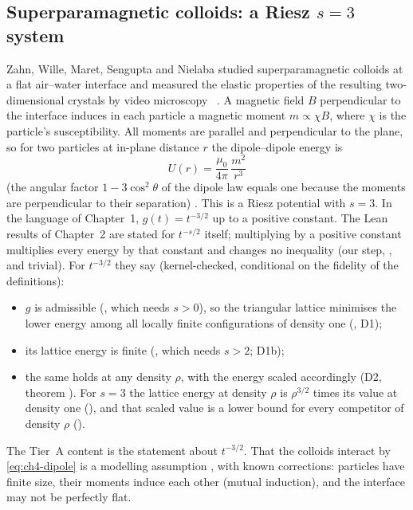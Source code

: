 \subsection{Superparamagnetic colloids: a Riesz \texorpdfstring{$s=3$}{s = 3} system}
Zahn, Wille, Maret, Sengupta and Nielaba studied superparamagnetic colloids at a flat air--water interface and
measured the elastic properties of the resulting two-dimensional crystals by video
microscopy~\cite{zahn} \tierL. A magnetic field $B$ perpendicular to the interface induces in each particle a
magnetic moment $m\propto\chi B$, where $\chi$ is the particle's susceptibility. All moments are parallel and
perpendicular to the plane, so for two particles at in-plane distance $r$ the dipole--dipole energy is
\begin{equation}\label{eq:ch4-dipole}
U(r) = \frac{\mu_0}{4\pi}\,\frac{m^2}{r^3}
\end{equation}
(the angular factor $1-3\cos^2\theta$ of the dipole law equals one because the moments are perpendicular to their
separation) \tierC. This is a Riesz potential with $s=3$. In the language of Chapter~1,
$g(t) = t^{-3/2}$ up to a positive constant. The Lean results of Chapter~2 are stated for $t^{-s/2}$ itself;
multiplying by a positive constant multiplies every energy by that constant and changes no inequality (our step,
\tierC, and trivial). For $t^{-3/2}$ they say \tierA{} (kernel-checked, conditional on the fidelity of the
definitions):
\begin{itemize}
\item $g$ is admissible (, which needs $s>0$), so the triangular lattice minimises the lower
energy among all locally finite configurations of density one (, D1);
\item its lattice energy is finite (, which needs $s>2$; D1b);
\item the same holds at any density $\rho$, with the energy scaled accordingly (D2, theorem
). For $s=3$ the lattice energy at density $\rho$ is $\rho^{3/2}$ times its value at density one
(), and that scaled value is a lower bound for every competitor of density $\rho$
().
\end{itemize}
The Tier~A content is the statement about $t^{-3/2}$. That the colloids interact by \eqref{eq:ch4-dipole} is a
modelling assumption \tierC, with known corrections: particles have finite size, their moments induce each other
(mutual induction), and the interface may not be perfectly flat.

